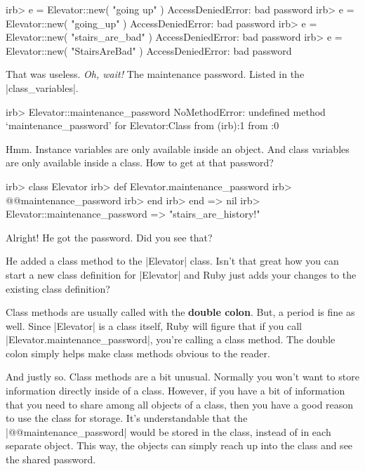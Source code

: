 \documentclass[12pt,twoside]{report}
\begin{document}
\begin{consolecode}

 irb> e = Elevator::new( "going up" )
 AccessDeniedError: bad password
 irb> e = Elevator::new( "going_up" )
 AccessDeniedError: bad password
 irb> e = Elevator::new( "stairs_are_bad" )
 AccessDeniedError: bad password
 irb> e = Elevator::new( "StairsAreBad" )
 AccessDeniedError: bad password

\end{consolecode}


That was useless.  {\em Oh, wait!}  The maintenance password.  Listed
in the \rubyinline|class_variables|.


\begin{consolecode}

 irb> Elevator::maintenance_password
 NoMethodError: undefined method `maintenance_password' for Elevator:Class
         from (irb):1
         from :0

\end{consolecode}


Hmm.  Instance variables are only available inside an object.  And
class variables are only available inside a class.  How to get at that
password?


\begin{consolecode}

 irb> class Elevator
 irb>   def Elevator.maintenance_password
 irb>     @@maintenance_password
 irb>   end
 irb> end
   => nil
 irb> Elevator::maintenance_password
   => "stairs_are_history!"

\end{consolecode}


Alright!  He got the password.  Did you see that?

He added a class method to the \rubyinline|Elevator|
class.  Isn't that great how you can start a new class definition for
\rubyinline|Elevator| and Ruby just adds your changes
to the existing class definition?

Class methods are usually called with the {\bf double colon}.  But, a
period is fine as well. Since \rubyinline|Elevator| is
a class itself, Ruby will figure that if you call
\rubyinline|Elevator.maintenance_password|, you're
calling a class method.  The double colon simply helps make class
methods obvious to the reader.

And justly so.  Class methods are a bit unusual.  Normally you won't
want to store information directly inside of a class.  However, if you
have a bit of information that you need to share among all objects of
a class, then you have a good reason to use the class for
storage. It's understandable that the
\rubyinline|@@maintenance_password| would be stored in
the class, instead of in each separate object.  This way, the objects
can simply reach up into the class and see the shared password.
\end{document}
